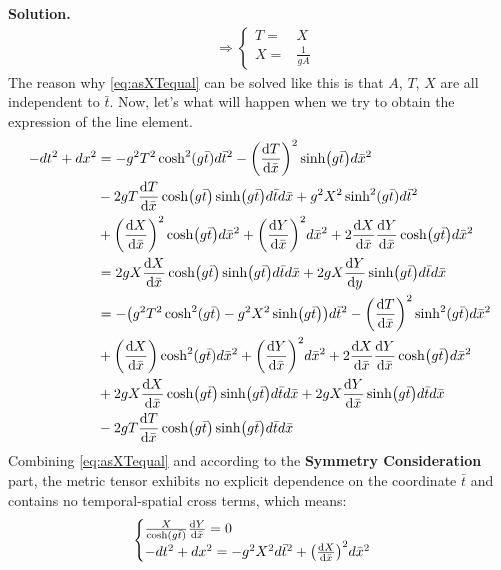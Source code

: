 \documentclass[12pt, a4paper, oneside]{article}
\newenvironment{solution}{\par\noindent\textbf{Solution. }}{\par}
\begin{document}
\begin{solution}
\begin{equation}
\begin{split}
            &\Rightarrow\boxed{
            \begin{cases}
                T=&X\\
                X=&\frac{1}{gA}
            \end{cases}}
        \end{split}\label{eq:asXTequal}
    \end{equation}
    The reason why \cref{eq:asXTequal} can be solved like this is that $A$, $T$, $X$ are all independent to $\bar{t}$. Now, let's what will happen when we try to obtain the expression of the line element.
    \begin{align}
        -dt^2+dx^2&=-g^2T^2\cosh^2(g\bar{t})d\bar{t}^2-\qty(\dv{T}{\bar{x}})^2\sinh(g\bar{t})d\bar{x}^2\nonumber\\
                  &-2gT\dv{T}{\bar{x}}\cosh(g\bar{t})\sinh(g\bar{t})d\bar{t}d\bar{x}+g^2X^2\sinh^2(g\bar{t})d\bar{t}^2\nonumber\\
                  &+\qty(\dv{X}{\bar{x}})^2\cosh(g\bar{t})d\bar{x}^2+\qty(\dv{Y}{\bar{x}})^2d\bar{x}^2+2\dv{X}{\bar{x}}\dv{Y}{\bar{x}}\cosh(g\bar{t})d\bar{x}^2\nonumber\\
                  &=2gX\dv{X}{\bar{x}}\cosh(g\bar{t})\sinh(g\bar{t})d\bar{t}d\bar{x}+2gX\dv{Y}{y}\sinh(g\bar{t})d\bar{t}d\bar{x}\nonumber\\
                  &=-\qty(g^2T^2\cosh^2(g\bar{t})-g^2X^2\sinh(g\bar{t}))d\bar{t}^2-\qty(\dv{T}{\bar{x}})^2\sinh^2(g\bar{t})d\bar{x}^2\nonumber\\
                  &+\qty(\dv{X}{\bar{x}})\cosh^2(g\bar{t})d\bar{x}^2+\qty(\dv{Y}{\bar{x}})^2d\bar{x}^2+2\dv{X}{\bar{{x}}}\dv{Y}{\bar{x}}\cosh(g\bar{t})d\bar{x}^2\nonumber\\
                  &+2gX\dv{X}{\bar{x}}\cosh(g\bar{t})\sinh(g\bar{t})d\bar{t}d\bar{x}+2gX\dv{Y}{\bar{x}}\sinh(g\bar{t})d\bar{t}d\bar{x}\nonumber\\
                  &-2gT\dv{T}{\bar{x}}\cosh(g\bar{t})\sinh(g\bar{t})d\bar{t}d\bar{x}
    \end{align}
    Combining \cref{eq:asXTequal} and according to the \textbf{Symmetry Consideration} part, the metric tensor exhibits no explicit dependence on the coordinate $\bar{t}$ and contains no temporal-spatial cross terms, which means:
    \begin{equation}
        \begin{cases}
            \frac{X}{\cosh(g\bar{t})}\dv{Y}{\bar{x}}=0\\
            -dt^2+dx^2=-g^2X^2d\bar{t}^2+\qty(\dv{X}{\bar{x}})^2d\bar{x}^2

\end{cases}
\end{equation}
\end{solution}
\end{document}
